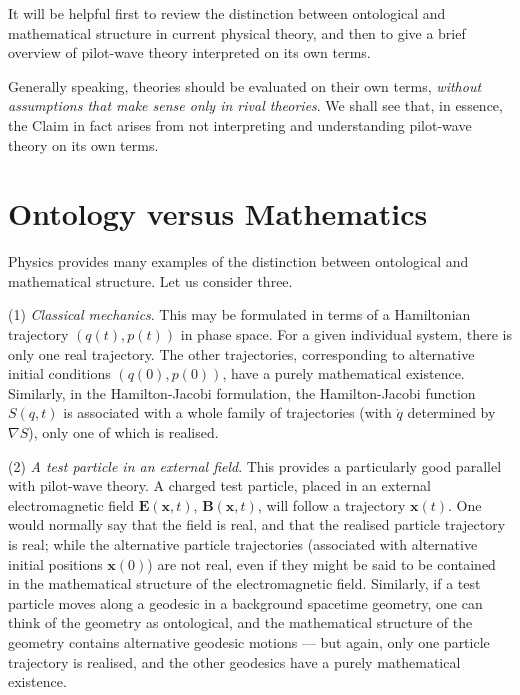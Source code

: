 \documentclass[12pt]{article}%
\begin{document}
It will be helpful first to review the distinction between ontological and
mathematical structure in current physical theory, and then to give a brief
overview of pilot-wave theory interpreted on its own terms.

Generally speaking, theories should be evaluated on their own terms,
\textit{without assumptions that make sense only in rival theories}. We shall
see that, in essence, the Claim in fact arises from not interpreting and
understanding pilot-wave theory on its own terms.

\section{Ontology versus Mathematics}

Physics provides many examples of the distinction between ontological and
mathematical structure. Let us consider three.

(1)\textit{ Classical mechanics}. This may be formulated in terms of a
Hamiltonian trajectory $(q(t),p(t))$ in phase space. For a given individual
system, there is only one real trajectory. The other trajectories,
corresponding to alternative initial conditions $(q(0),p(0))$, have a purely
mathematical existence. Similarly, in the Hamilton-Jacobi formulation, the
Hamilton-Jacobi function $S(q,t)$ is associated with a whole family of
trajectories (with $\dot{q}$ determined by $\nabla S$), only one of which is realised.

(2) \textit{A test particle in an external field}. This provides a
particularly good parallel with pilot-wave theory. A charged test particle,
placed in an external electromagnetic field $\mathbf{E}(\mathbf{x},t)$,
$\mathbf{B}(\mathbf{x},t)$, will follow a trajectory $\mathbf{x}(t)$. One
would normally say that the field is real, and that the realised particle
trajectory is real; while the alternative particle trajectories (associated
with alternative initial positions $\mathbf{x}(0)$) are not real, even if they
might be said to be contained in the mathematical structure of the
electromagnetic field. Similarly, if a test particle moves along a geodesic in
a background spacetime geometry, one can think of the geometry as ontological,
and the mathematical structure of the geometry contains alternative geodesic
motions --- but again, only one particle trajectory is realised, and the other
geodesics have a purely mathematical existence.
\end{document}
